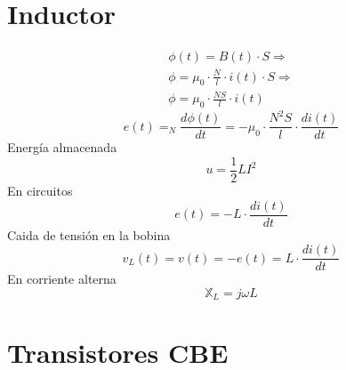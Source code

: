 \documentclass[12pt,spanish,lettersize,twocolumn]{article}
\begin{document}
\section{Inductor}
\begin{eqnarray}
\nonumber \phi(t)=B(t)\cdot S\Rightarrow\\
\nonumber \phi=\mu_0\cdot \frac{N}{l}\cdot i(t)\cdot S\Rightarrow\\
\nonumber \phi=\mu_0\cdot\frac{NS}{l}\cdot i(t)
\end{eqnarray}
\begin{equation*}
e(t)=_N\frac{d\phi(t)}{dt}=-\mu_0\cdot\frac{N^2S}{l}\cdot\frac{di(t)}{dt}
\end{equation*}
Energ\'ia almacenada
\begin{equation*}
u=\frac{1}{2}LI^2
\end{equation*}
En circuitos
\begin{equation*}
e(t)=-L\cdot\frac{di(t)}{dt}
\end{equation*}
Caida de tensi\'on en la bobina
\begin{equation*}
v_L(t)=v(t)=-e(t)=L\cdot\frac{di(t)}{dt}
\end{equation*}
En corriente alterna
\begin{equation*}
\mathbb{X}_L=j\omega L
\end{equation*}

\section{Transistores CBE}
\end{document}
